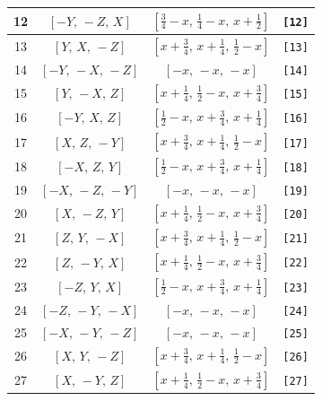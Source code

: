\documentclass[fleqn,8pt]{jsarticle}
\begin{document}
\begin{longtable}{cccc}
12 & $\left[ - Y,\, - Z,\, X \right]$ & $\left[ \frac{3}{4} - x,\, \frac{1}{4} - x,\, x + \frac{1}{2} \right]$ & {\tt [12]} \\ \hline
13 & $\left[ Y,\, X,\, - Z \right]$ & $\left[ x + \frac{3}{4},\, x + \frac{1}{4},\, \frac{1}{2} - x \right]$ & {\tt [13]} \\ \hline
14 & $\left[ - Y,\, - X,\, - Z \right]$ & $\left[ - x,\, - x,\, - x \right]$ & {\tt [14]} \\ \hline
15 & $\left[ Y,\, - X,\, Z \right]$ & $\left[ x + \frac{1}{4},\, \frac{1}{2} - x,\, x + \frac{3}{4} \right]$ & {\tt [15]} \\ \hline
16 & $\left[ - Y,\, X,\, Z \right]$ & $\left[ \frac{1}{2} - x,\, x + \frac{3}{4},\, x + \frac{1}{4} \right]$ & {\tt [16]} \\ \hline
17 & $\left[ X,\, Z,\, - Y \right]$ & $\left[ x + \frac{3}{4},\, x + \frac{1}{4},\, \frac{1}{2} - x \right]$ & {\tt [17]} \\ \hline
18 & $\left[ - X,\, Z,\, Y \right]$ & $\left[ \frac{1}{2} - x,\, x + \frac{3}{4},\, x + \frac{1}{4} \right]$ & {\tt [18]} \\ \hline
19 & $\left[ - X,\, - Z,\, - Y \right]$ & $\left[ - x,\, - x,\, - x \right]$ & {\tt [19]} \\ \hline
20 & $\left[ X,\, - Z,\, Y \right]$ & $\left[ x + \frac{1}{4},\, \frac{1}{2} - x,\, x + \frac{3}{4} \right]$ & {\tt [20]} \\ \hline
21 & $\left[ Z,\, Y,\, - X \right]$ & $\left[ x + \frac{3}{4},\, x + \frac{1}{4},\, \frac{1}{2} - x \right]$ & {\tt [21]} \\ \hline
22 & $\left[ Z,\, - Y,\, X \right]$ & $\left[ x + \frac{1}{4},\, \frac{1}{2} - x,\, x + \frac{3}{4} \right]$ & {\tt [22]} \\ \hline
23 & $\left[ - Z,\, Y,\, X \right]$ & $\left[ \frac{1}{2} - x,\, x + \frac{3}{4},\, x + \frac{1}{4} \right]$ & {\tt [23]} \\ \hline
24 & $\left[ - Z,\, - Y,\, - X \right]$ & $\left[ - x,\, - x,\, - x \right]$ & {\tt [24]} \\ \hline
25 & $\left[ - X,\, - Y,\, - Z \right]$ & $\left[ - x,\, - x,\, - x \right]$ & {\tt [25]} \\ \hline
26 & $\left[ X,\, Y,\, - Z \right]$ & $\left[ x + \frac{3}{4},\, x + \frac{1}{4},\, \frac{1}{2} - x \right]$ & {\tt [26]} \\ \hline
27 & $\left[ X,\, - Y,\, Z \right]$ & $\left[ x + \frac{1}{4},\, \frac{1}{2} - x,\, x + \frac{3}{4} \right]$ & {\tt [27]} \\ \hline

\end{longtable}
\end{document}
